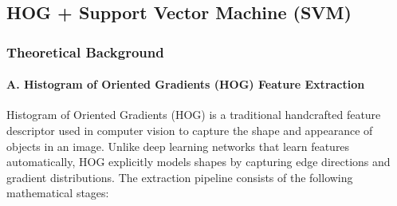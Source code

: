 \documentclass[12pt,a4paper]{article}
\begin{document}
\subsection{HOG + Support Vector Machine (SVM)}

\subsubsection{Theoretical Background}

\paragraph{A. Histogram of Oriented Gradients (HOG) Feature Extraction}
Histogram of Oriented Gradients (HOG) is a traditional handcrafted feature descriptor used in computer vision to capture the shape and appearance of objects in an image. Unlike deep learning networks that learn features automatically, HOG explicitly models shapes by capturing edge directions and gradient distributions. The extraction pipeline consists of the following mathematical stages:
\end{document}
